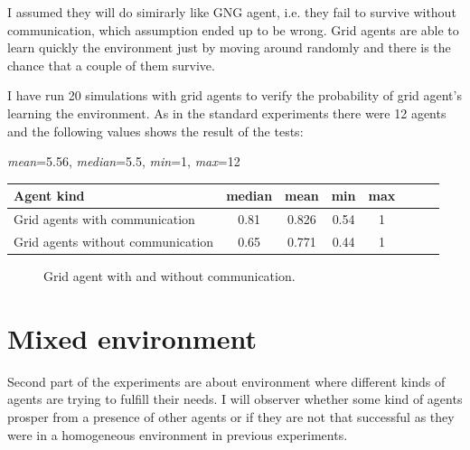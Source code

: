 I assumed they will do simirarly like GNG agent, i.e. they fail to survive without communication, which assumption ended up to be wrong. Grid agents are able to learn quickly the environment just by moving around randomly and there is the chance that a couple of them survive.

I have run 20 simulations with grid agents to verify the probability of grid agent's learning the environment. As in the standard experiments there were 12 agents and the following values shows the result of the tests:


\begin{center}   
  \emph{mean}=5.56, \emph{median}=5.5, \emph{min}=1, \emph{max}=12                 
\end{center}

\begin{center}   
  \begin{tabular}{l*{6}{c}r}
  Agent kind        & median & mean & min & max \\
  \hline  
  Grid agents with communication        & 0.81 & 0.826 & 0.54 & 1 \\
  Grid agents without communication        & 0.65 & 0.771 & 0.44 & 1 \\
  \end{tabular}                  
\end{center}



\begin{figure}[h!]
  \centering        
  \caption{Grid agent with and without communication.}
\end{figure} 

\clearpage

\section{Mixed environment}
                        
Second part of the experiments are about environment where different kinds of agents are trying to fulfill their needs. I will observer whether some kind of agents prosper from a presence of other agents or if they are not that successful as they were in a homogeneous environment in previous experiments.
                                                                                
